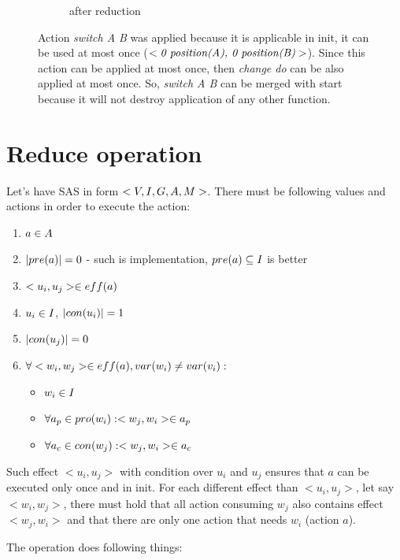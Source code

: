 \begin{figure}
\begin{subfigure}[b]{0.4\textwidth}
			\caption{after reduction}
		\end{subfigure}
		\caption{Action \emph{switch A B} was applied because it is applicable in init, it can be used at most once ($<\emph{0 position(A), 0 position(B)}>$). Since this action can be applied at most once, then \emph{change do} can be also applied at most once. So, \emph{switch A B} can be merged with start because it will not destroy application of any other function.	}
	\end{figure}
	
	\section{Reduce operation}
	Let's have SAS in form $<V, I, G, A, M{}>$. There must be following values and actions in order to execute the action:
	
	\begin{enumerate}
		\item $a \in A$
		\item $|pre(a)| = 0$ - such is implementation, $pre(a) \subseteq{I}$ is better 
		\item $<u_i,u_j> \in eff(a)$
		\item $u_i \in I$, $|con(u_i)| = 1$
		\item $|con(u_j)| = 0$
		\item $\forall <w_i, w_j> \in eff(a), var(w_i) \neq var(v_i):$
		\begin{itemize}
			\item $w_i \in I$
			\item $ \forall a_p \in pro(w_i): <w_j,w_i> \in a_p $ 
			\item $ \forall a_c \in con(w_j): <w_j,w_i> \in a_c $ 
		\end{itemize}
	\end{enumerate}
	
	Such effect $<u_i, u_j>$ with condition over $u_i$ and $u_j$ ensures that $a$ can be executed only once and in init. For each different effect than $<u_i,u_j>$, let say $<w_i,w_j>$, there must hold that all action consuming $w_j$ also contains effect $<w_j,w_i>$ and that there are only one action that needs $w_i$ (action $a$).
	
	The operation does following things:
	
